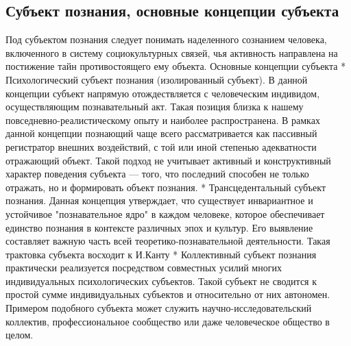 \documentclass[12pt]{article}
\begin{document}
\subsection{Субъект познания, основные концепции субъекта}
Под субъектом познания следует понимать наделенного сознанием человека, включенного в систему
социокультурных связей, чья активность направлена на постижение тайн противостоящего ему объекта. 
Основные концепции субъекта
 * Психологический субъект познания (изолированный субъект). В данной концепции субъект напрямую
отождествляется с человеческим индивидом, осуществляющим познавательный акт. Такая позиция близка к
нашему повседневно-реалистическому опыту и наиболее распространена. В рамках данной концепции
познающий чаще всего рассматривается как пассивный регистратор внешних воздействий, с той или иной
степенью адекватности отражающий объект. Такой подход не учитывает активный и конструктивный характер
поведения субъекта — того, что последний способен не только отражать, но и формировать объект познания.
 * Трансцедентальный субъект познания. Данная концепция утверждает, что существует инвариантное и
устойчивое "познавательное ядро" в каждом человеке, которое обеспечивает единство познания в контексте
различных эпох и культур. Его выявление составляет важную часть всей теоретико-познавательной
деятельности. Такая трактовка субъекта восходит к И.Канту
 * Коллективный субъект познания практически реализуется посредством совместных усилий многих
индивидуальных психологических субъектов. Такой субъект не сводится к простой сумме индивидуальных
субъектов и относительно от них автономен. Примером подобного субъекта может служить научно-исследовательский коллектив, профессиональное сообщество или даже человеческое общество в целом.
\end{document}
